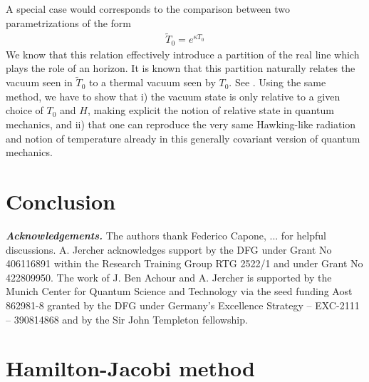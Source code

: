 \documentclass[onecolumn,notitlepage,superscriptaddress, nofootinbib,nobibnotes, aps,prd,10pt]{revtex4-1}%
\def\be{\begin{eqnarray}}
\def\ee{\end{eqnarray}}
\begin{document}
A special case would corresponds to the comparison between two parametrizations of the form
\be
\tilde{T}_0 = e^{\kappa T_0}
\ee
We know that this relation effectively introduce a partition of the real line which plays the role of an horizon. It is known that this partition naturally relates the vacuum seen in $\tilde{T}_0$ to a thermal vacuum  seen by $T_0$. See \cite{Arzano:2018oby,Arzano:2020mhg}. Using the same method, we have to show that i) the vacuum state is only relative to a given choice of $T_0$ and $H$, making explicit the notion of relative state in quantum mechanics, and ii) that one can reproduce the very same Hawking-like radiation and notion of temperature already in this generally covariant version of quantum mechanics. 




\section{Conclusion}

 \bigskip 

\noindent\textit{\textbf{Acknowledgements.}}
The authors thank Federico Capone, ... for helpful discussions. A. Jercher acknowledges support by the DFG under Grant No 406116891 within the Research Training Group RTG 2522/1 and under Grant No 422809950. The work of J. Ben Achour and A. Jercher is supported by the Munich Center for Quantum Science and Technology via the seed funding Aost 862981-8 granted by the DFG under Germany’s Excellence Strategy – EXC-2111 – 390814868 and by the Sir John Templeton fellowship.


\newpage
\appendix

\section{Hamilton-Jacobi method}

\label{HJM}
\end{document}
